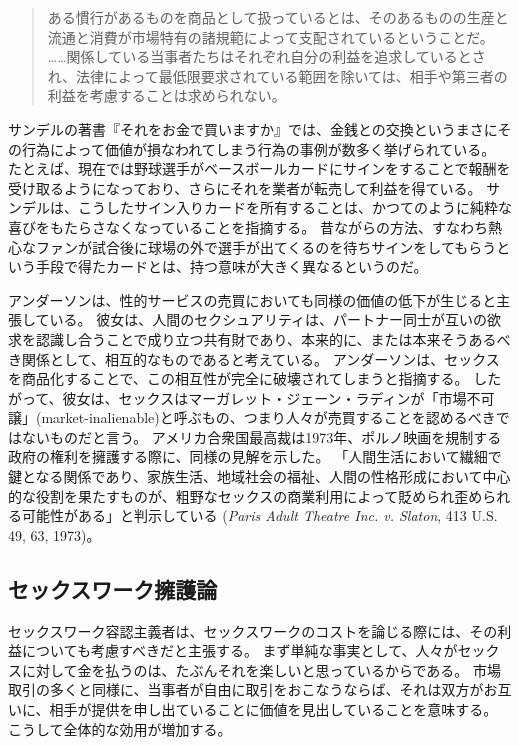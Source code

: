 \documentclass[paper=a4,book,openany]{jlreq} \usepackage{mystyle}
\begin{document}
\begin{quote}

ある慣行があるものを商品として扱っているとは、そのあるものの生産と流通と消費が市場特有の諸規範によって支配されているということだ。
……関係している当事者たちはそれぞれ自分の利益を追求しているとされ、法律によって最低限要求されている範囲を除いては、相手や第三者の利益を考慮することは求められない。
\citep[pp.19--20]{anderson00:_why_commer_surrog_mother_uneth}

\end{quote}

サンデルの著書『それをお金で買いますか』\citep{sandel12:money_cant_buy}では、金銭との交換というまさにその行為によって価値が損なわれてしまう行為の事例が数多く挙げられている。
たとえば、現在では野球選手がベースボールカードにサインをすることで報酬を受け取るようになっており、さらにそれを業者が転売して利益を得ている。
サンデルは、こうしたサイン入りカードを所有することは、かつてのように純粋な喜びをもたらさなくなっていることを指摘する。
昔ながらの方法、すなわち熱心なファンが試合後に球場の外で選手が出てくるのを待ちサインをしてもらうという手段で得たカードとは、持つ意味が大きく異なるというのだ。

アンダーソンは、性的サービスの売買においても同様の価値の低下が生じると主張している。
彼女は、人間のセクシュアリティは、パートナー同士が互いの欲求を認識し合うことで成り立つ共有財であり、本来的に、または本来そうあるべき関係として、相互的なものであると考えている。
アンダーソンは、セックスを商品化することで、この相互性が完全に破壊されてしまうと指摘する\citep[p.154]{anderson93:_value_ethic_econom}。
したがって、彼女は、セックスはマーガレット・ジェーン・ラディンが「市場不可譲」(market-inalienable)と呼ぶもの、つまり人々が売買することを認めるべきではないものだと言う\citep{radin87:_market_inalien,radin00:_contes_commod,satz10:_why_some_thing_shoul_not_be_sale}。
アメリカ合衆国最高裁は1973年、ポルノ映画を規制する政府の権利を擁護する際に、同様の見解を示した。
「人間生活において繊細で鍵となる関係であり、家族生活、地域社会の福祉、人間の性格形成において中心的な役割を果たすものが、粗野なセックスの商業利用によって貶められ歪められる可能性がある」と判示している
(\emph{Paris Adult Theatre Inc. v. Slaton}, 413 U.S. 49, 63, 1973)。

\subsection{セックスワーク擁護論}

セックスワーク容認主義者は、セックスワークのコストを論じる際には、その利益についても考慮すべきだと主張する。
まず単純な事実として、人々がセックスに対して金を払うのは、たぶんそれを楽しいと思っているからである。
市場取引の多くと同様に、当事者が自由に取引をおこなうならば、それは双方がお互いに、相手が提供を申し出ていることに価値を見出していることを意味する。
こうして全体的な効用が増加する。
\end{document}
